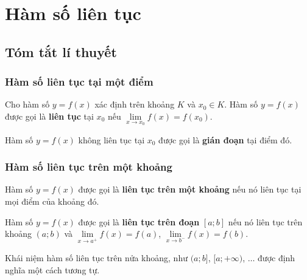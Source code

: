 \section{Hàm số liên tục}
\subsection{Tóm tắt lí thuyết}
\subsubsection{Hàm số liên tục tại một điểm}
\begin{dn}
Cho hàm số $y=f(x)$ xác định trên khoảng $K$ và $x_0\in K$. Hàm số $y=f(x)$ được gọi là \textbf{liên tục} tại $x_0$ nếu $\lim\limits_{x\to x_0}f(x)=f(x_0)$.
\end{dn}

\begin{note}
Hàm số $y=f(x)$ không liên tục tại $x_0$ được gọi là \textbf{gián đoạn} tại điểm đó.
\end{note}

\subsubsection{Hàm số liên tục trên một khoảng}

\begin{dn}
Hàm số $y=f(x)$ được gọi là \textbf{liên tục trên một khoảng} nếu nó liên tục tại mọi điểm của khoảng đó.
\end{dn}

\begin{dn}
Hàm số $y=f(x)$ được gọi là \textbf{liên tục trên đoạn} $[a;b]$ nếu nó liên tục trên khoảng $(a;b)$ và 
$\lim\limits_{x\to a^+}f(x)=f(a)$, $\lim\limits_{x\to b^-}f(x)=f(b)$.
\end{dn}

\begin{note}
Khái niệm hàm số liên tục trên nửa khoảng, như $(a;b]$, $[a;+\infty)$, $\ldots$ được định nghĩa một cách tương tự.
\end{note}

\begin{note}
\end{note}

